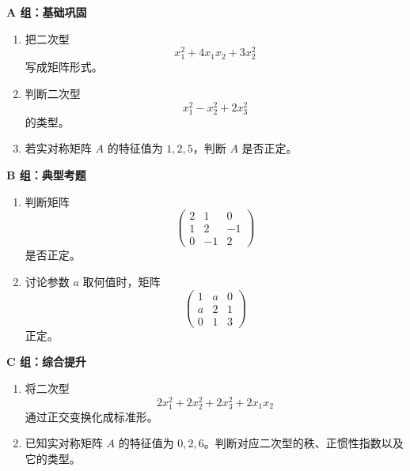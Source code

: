 \documentclass[11pt,oneside,UTF8]{ctexbook}
\begin{document}
\begin{exercisebox}[第 5 章分级习题]
\textbf{A 组：基础巩固}
\begin{enumerate}[label=\textbf{A\arabic*.}]
  \item 把二次型
  \[
  x_1^2+4x_1x_2+3x_2^2
  \]
  写成矩阵形式。
  \item 判断二次型
  \[
  x_1^2-x_2^2+2x_3^2
  \]
  的类型。
  \item 若实对称矩阵 \(A\) 的特征值为 \(1,2,5\)，判断 \(A\) 是否正定。
\end{enumerate}

\textbf{B 组：典型考题}
\begin{enumerate}[label=\textbf{B\arabic*.}]
  \item 判断矩阵
  \[
  \begin{pmatrix}
  2&1&0\\
  1&2&-1\\
  0&-1&2
  \end{pmatrix}
  \]
  是否正定。
  \item 讨论参数 \(a\) 取何值时，矩阵
  \[
  \begin{pmatrix}
  1&a&0\\
  a&2&1\\
  0&1&3
  \end{pmatrix}
  \]
  正定。
\end{enumerate}

\textbf{C 组：综合提升}
\begin{enumerate}[label=\textbf{C\arabic*.}]
  \item 将二次型
  \[
  2x_1^2+2x_2^2+2x_3^2+2x_1x_2
  \]
  通过正交变换化成标准形。
  \item 已知实对称矩阵 \(A\) 的特征值为 \(0,2,6\)。判断对应二次型的秩、正惯性指数以及它的类型。
\end{enumerate}
\end{exercisebox}
\end{document}

